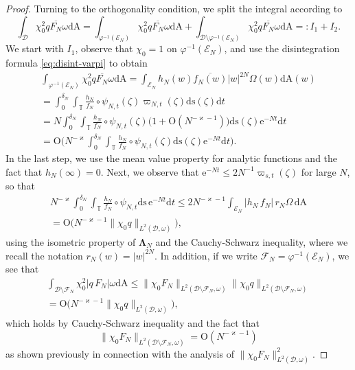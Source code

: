 \documentclass{amsart}
\newcommand{\be}{\begin{equation}}
\newcommand{\ee}{\end{equation}}
\newcommand{\T}{\mathbb{T}}
\newcommand{\calD}{\mathcal{D}}
\newcommand{\calE}{\mathcal{E}}
\newcommand{\diffA}{\mathrm{dA}}
\newcommand{\diffs}{\mathrm{ds}}
\newcommand{\diff}{\mathrm{d}}
\newcommand{\Lamop}{\mathbf{\Lambda}}
\theoremstyle{definition}
\theoremstyle{remark}
\newcommand{\e}{\mathrm{e}}
\newcommand{\Ordo}{\mathrm{O}}
\numberwithin{equation}{subsection}
\begin{document}
\begin{proof}
Turning to the orthogonality condition, 
we split the integral according to
\be\label{eq:split-flow-conseq}
\int_{\calD}\chi_0^2q\overline{F_N}\omega\diffA
=\int_{\varphi^{-1}(\calE_N)}\chi_0^2q\overline{F_N}\omega\diffA
+\int_{\calD\setminus\varphi^{-1}(\calE_N)}\chi_0^2q\overline{F_N}\omega\diffA
=:I_1+I_2.
\ee
We start with $I_1$, observe that $\chi_0=1$ on $\varphi^{-1}(\calE_N)$, and use 
the disintegration formula \eqref{eq:disint-varpi} to obtain
\begin{multline*}
\int_{\varphi^{-1}(\calE_N)}\chi_0^2 q \overline{F_N}\omega\diffA
=\int_{\calE_N} h_N(w)\overline{f_N(w)}|w|^{2N}\Omega(w)\diffA(w)
\\=
\int_{0}^{\delta_N}
\int_\T \frac{h_N}{f_N}
\circ\psi_{N,t}(\zeta)
\varpi_{N,t}(\zeta)\diffs(\zeta)\diff t\\
=N\int_{0}^{\delta_N}\int_\T
\frac{h_N}{f_N}\circ\psi_{N,t}(\zeta)
\Big(1+\Ordo(N^{-\varkappa-1})\Big)\diffs(\zeta)\e^{-Nt}\diff t\\
=\Ordo\Big(N^{-\varkappa}\int_{0}^{\delta_N}\int_\T
\frac{h_N}{f_N}\circ\psi_{N,t}(\zeta)
\diffs(\zeta)\e^{-Nt}\diff t\Big).
\end{multline*}
In the last step, we use the mean value 
property for analytic functions
and the fact that $h_N(\infty)=0$.
Next, we observe that
$\e^{-Nt} \le 2N^{-1}\varpi_{s,t}(\zeta)$ for large $N$,
so that
\begin{multline}
N^{-\varkappa}\int_{0}^{\delta_N}\int_\T
\frac{h_N}{f_N}\circ\psi_{N,t}
\diffs\,\e^{-Nt}\diff t\le
2N^{-\varkappa-1}\int_{\calE_N}|h_N\,f_N|\,r_N\Omega\,\diffA
\\=\Ordo\big(N^{-\varkappa-1}\lVert \chi_0 q\rVert_{L^2(\calD,\omega)}\big),
\end{multline}
using the isometric property of $\Lamop_N$ and the Cauchy-Schwarz inequality,
where we recall the notation $r_N(w)=|w|^{2N}$.
In addition, if we write $\mathcal{F}_N=\varphi^{-1}(\calE_N)$,
we see that
\begin{multline}
\int_{\calD\setminus\mathcal{F}_N} \chi_0^2 |q\,F_N|\omega\diffA
\le \lVert \chi_0 F_N\rVert_{L^2(\calD\setminus\mathcal{F}_N,\omega)}
\lVert \chi_0 q\rVert_{L^2(\calD\setminus\mathcal{F}_N,\omega)}
\\=\Ordo\Big(N^{-\varkappa-1}\lVert \chi_0 q\rVert_{L^2(\calD,\omega)}\Big),
\end{multline}
which holds by Cauchy-Schwarz inequality and the fact that 
\be
\lVert \chi_0 F_N\rVert_{L^2(\calD\setminus\mathcal{F}_N,\omega)}=\Ordo(N^{-\varkappa-1})
\ee 
as shown previously in connection with the analysis 
of $\lVert \chi_0 F_N\rVert_{L^2(\calD,\omega)}^2$.
\end{proof}
\end{document}
